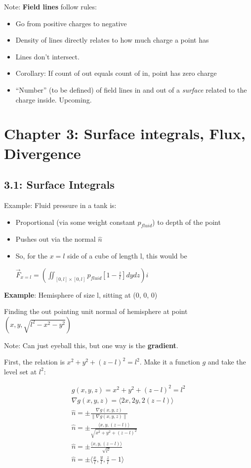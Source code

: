 \documentclass[11pt, oneside]{article}   	%
\begin{document}
Note: \textbf{Field lines} follow rules:
\begin{itemize}
\item Go from positive charges to negative
\item Density of lines directly relates to how much charge a point has
\item Lines don't intersect.
\item Corollary: If count of out equals count of in, point has zero charge
\item ``Number'' (to be defined) of field lines in and out of a \emph{surface} related to the charge inside.  Upcoming.
\end{itemize}

\section{Chapter 3: Surface integrals, Flux, Divergence}

\subsection{3.1: Surface Integrals}

Example: Fluid pressure in a tank is:
\begin{itemize}
\item Proportional (via some weight constant $p_{fluid}$) to depth of the point
\item Pushes out via the normal $\hat{n}$ 
\item So, for the $x=l$ side of a cube of length l, this would be 

$\vec{F}_{x=l} = (\iint_{[0,l] \times [0,l]} p_{fluid} [1 - \frac{z}{l}] dy dz) \hat{i}$
\end{itemize}



\textbf{Example}: Hemisphere of size l, sitting at (0, 0, 0)

Finding the out pointing unit normal of hemisphere at point $(x, y, \sqrt{l^2-x^2-y^2})$

Note: Can just eyeball this, but one way is the \textbf{gradient}.  

First, the relation is $x^2 + y^2 + (z-l)^2 = l^2$.
Make it a function $g$ and take the level set at $l^2$:

\begin{align}
g(x,y,z) = x^2  + y^2 + (z - l)^2 = l^2 \\
\nabla g(x,y,z) = \langle 2x , 2y , 2(z-l)  \rangle \\
\hat{n} = \pm \frac{\nabla g(x,y,z)}{ \|\nabla g(x,y,z) \|} \\ 
\hat{n} = \pm \frac{\langle x , y , (z-l)  \rangle}{\sqrt{x^2 + y^2 + (z-l)^2}} \\
\hat{n} = \pm \frac{\langle x , y , (z-l) \rangle}{\sqrt{l^2}} \\
\hat{n} = \pm \langle \frac{x}{l}, \frac{y}{l} ,\frac{z}{l} - 1\rangle \\
\end{align}
\end{document}
